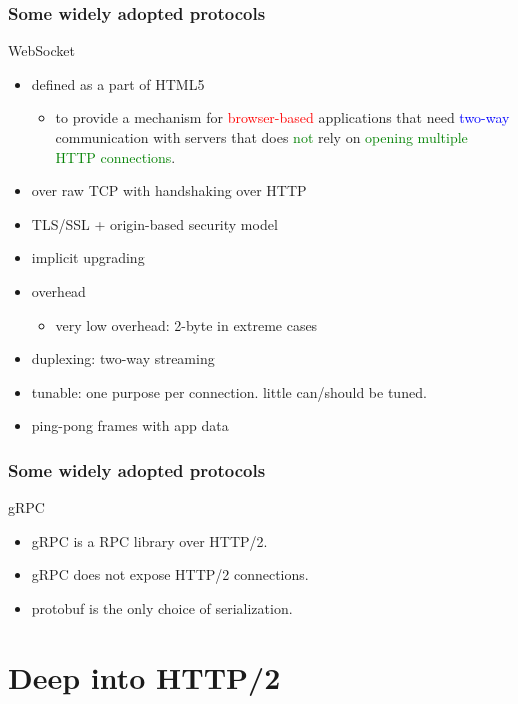 \documentclass[lualatex]{beamer}
\begin{document}
\begin{frame}
  \frametitle{Some widely adopted protocols}

  \begin{block}{WebSocket}
    \begin{itemize}
    \item defined as a part of HTML5
      \begin{itemize}
      \item to provide a mechanism for \textcolor{red}{browser-based} applications that need \textcolor{blue}{two-way} communication with servers that does \textcolor{green}{not} rely on \textcolor{green}{opening multiple HTTP connections}.
      \end{itemize}
    \item over raw TCP with handshaking over HTTP
    \item TLS/SSL + origin-based security model
    \item implicit upgrading
    \item overhead
      \begin{itemize}
      \item very low overhead: 2-byte in extreme cases
      \end{itemize}
    \item duplexing: two-way streaming
    \item tunable: one purpose per connection. little can/should be tuned.
    \item ping-pong frames with app data
    \end{itemize}
  \end{block}
\end{frame}

\begin{frame}
  \frametitle{Some widely adopted protocols}

  \begin{block}{gRPC}
    \begin{itemize}
    \item gRPC is a RPC library over HTTP/2.
    \item gRPC does not expose HTTP/2 connections.
    \item protobuf is the only choice of serialization.
    \end{itemize}
  \end{block}
\end{frame}

\section{Deep into HTTP/2}
\end{document}
